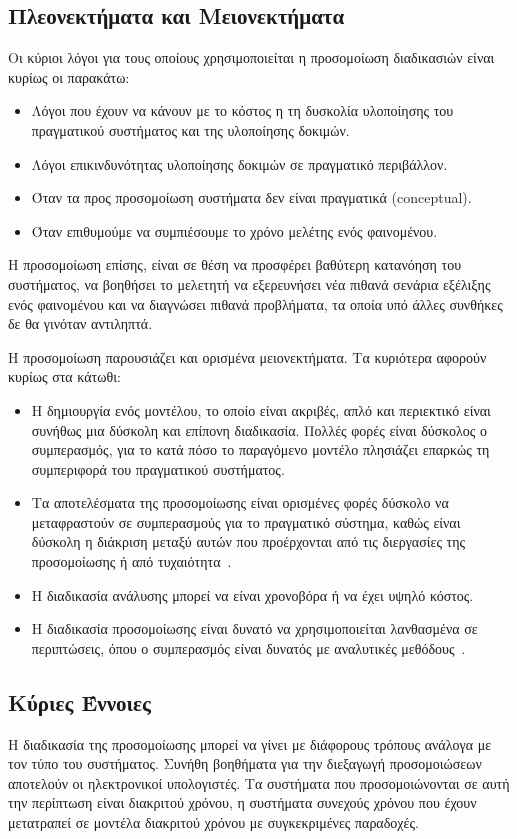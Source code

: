 \documentclass[12pt]{report}
\begin{document}
\subsection{Πλεονεκτήματα και Μειονεκτήματα}
Οι κύριοι λόγοι για τους οποίους χρησιμοποιείται η προσομοίωση διαδικασιών είναι κυρίως οι παρακάτω:

\begin{itemize}
  \item Λόγοι που έχουν να κάνουν με το κόστος η τη δυσκολία υλοποίησης του πραγματικού συστήματος και της υλοποίησης δοκιμών.
  \item Λόγοι επικινδυνότητας υλοποίησης δοκιμών σε πραγματικό περιβάλλον.
  \item Όταν τα προς προσομοίωση συστήματα δεν είναι πραγματικά (\textlatin{conceptual}).
  \item Όταν επιθυμούμε να συμπιέσουμε το χρόνο μελέτης ενός φαινομένου.
\end{itemize}

Η προσομοίωση επίσης, είναι σε θέση να προσφέρει βαθύτερη κατανόηση του συστήματος, να βοηθήσει το μελετητή να εξερευνήσει νέα πιθανά σενάρια εξέλιξης ενός φαινομένου και να διαγνώσει πιθανά προβλήματα, τα οποία υπό άλλες συνθήκες δε θα γινόταν αντιληπτά.

Η προσομοίωση παρουσιάζει και ορισμένα μειονεκτήματα. Τα κυριότερα αφορούν κυρίως στα κάτωθι:

\begin{itemize}
  \item Η δημιουργία ενός μοντέλου, το οποίο είναι ακριβές, απλό και περιεκτικό είναι συνήθως μια δύσκολη και επίπονη διαδικασία. Πολλές φορές είναι δύσκολος ο συμπερασμός, για το κατά πόσο το παραγόμενο μοντέλο πλησιάζει επαρκώς τη συμπεριφορά του πραγματικού συστήματος.
  \item Τα αποτελέσματα της προσομοίωσης είναι ορισμένες φορές δύσκολο να μεταφραστούν σε συμπερασμούς για το πραγματικό σύστημα, καθώς είναι δύσκολη η διάκριση μεταξύ αυτών που προέρχονται από τις διεργασίες της προσομοίωσης ή από τυχαιότητα~\cite{book:04}.
  \item Η διαδικασία ανάλυσης μπορεί να είναι χρονοβόρα ή να έχει υψηλό κόστος.
  \item Η διαδικασία προσομοίωσης είναι δυνατό να χρησιμοποιείται λανθασμένα σε περιπτώσεις, όπου ο συμπερασμός είναι δυνατός με αναλυτικές μεθόδους~\cite{book:04}.
\end{itemize}

\subsection{Κύριες Έννοιες}
Η διαδικασία της προσομοίωσης μπορεί να γίνει με διάφορους τρόπους ανάλογα με τον τύπο του συστήματος. Συνήθη βοηθήματα για την διεξαγωγή προσομοιώσεων αποτελούν οι ηλεκτρονικοί υπολογιστές. Τα συστήματα που προσομοιώνονται σε αυτή την περίπτωση είναι διακριτού χρόνου, η συστήματα συνεχούς χρόνου που έχουν μετατραπεί σε μοντέλα διακριτού χρόνου με συγκεκριμένες παραδοχές.
\end{document}
